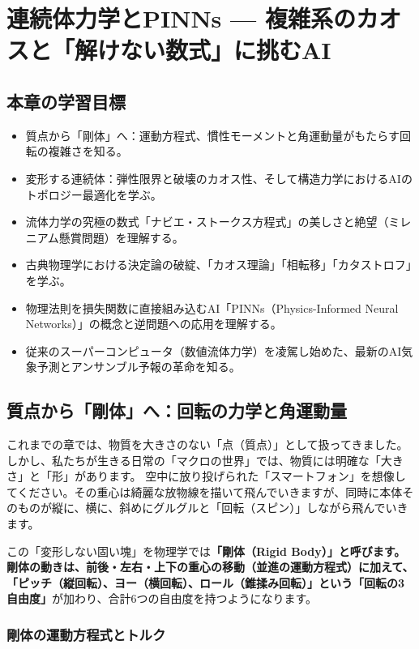 \chapter{連続体力学とPINNs --- 複雑系のカオスと「解けない数式」に挑むAI}

\section*{本章の学習目標}
\begin{itemize}
\item 質点から「剛体」へ：運動方程式、慣性モーメントと角運動量がもたらす回転の複雑さを知る。
\item 変形する連続体：弾性限界と破壊のカオス性、そして構造力学におけるAIのトポロジー最適化を学ぶ。
\item 流体力学の究極の数式「ナビエ・ストークス方程式」の美しさと絶望（ミレニアム懸賞問題）を理解する。
\item 古典物理学における決定論の破綻、「カオス理論」「相転移」「カタストロフ」を学ぶ。
\item 物理法則を損失関数に直接組み込むAI「PINNs（Physics-Informed Neural Networks）」の概念と逆問題への応用を理解する。
\item 従来のスーパーコンピュータ（数値流体力学）を凌駕し始めた、最新のAI気象予測とアンサンブル予報の革命を知る。
\end{itemize}

\section{質点から「剛体」へ：回転の力学と角運動量}

これまでの章では、物質を大きさのない「点（質点）」として扱ってきました。しかし、私たちが生きる日常の「マクロの世界」では、物質には明確な「大きさ」と「形」があります。 空中に放り投げられた「スマートフォン」を想像してください。その重心は綺麗な放物線を描いて飛んでいきますが、同時に本体そのものが縦に、横に、斜めにグルグルと「回転（スピン）」しながら飛んでいきます。

この「変形しない固い塊」を物理学では\textbf{「剛体（Rigid Body）」と呼びます。剛体の動きは、前後・左右・上下の重心の移動（並進の運動方程式）に加えて、「ピッチ（縦回転）、ヨー（横回転）、ロール（錐揉み回転）」という「回転の3自由度」}が加わり、合計6つの自由度を持つようになります。

\subsection{剛体の運動方程式とトルク}

